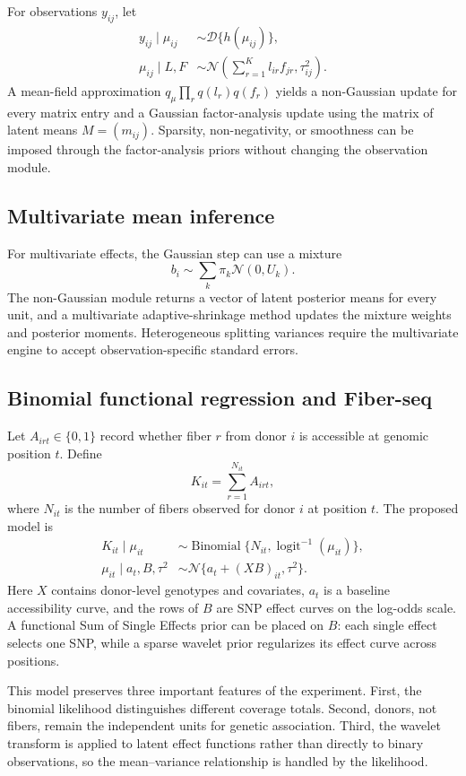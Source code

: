 \documentclass[11pt]{article}
\newcommand{\N}{\mathcal{N}}
\newcommand{\Bin}{\operatorname{Binomial}}
\newcommand{\sigmoid}{\operatorname{logit}^{-1}}
\begin{document}
For observations $y_{ij}$, let
\begin{align}
 y_{ij}\mid\mu_{ij}&\sim\mathcal{D}\{h(\mu_{ij})\},\\
 \mu_{ij}\mid L,F&\sim
 \N\left(\sum_{r=1}^K l_{ir}f_{jr},\tau_{ij}^2\right).
\end{align}
A mean-field approximation
$q_\mu\prod_r q(l_r)q(f_r)$ yields a non-Gaussian update for every matrix
entry and a Gaussian factor-analysis update using the matrix of latent means
$M=(m_{ij})$. Sparsity, non-negativity, or smoothness can be imposed through
the factor-analysis priors without changing the observation module.

\subsection{Multivariate mean inference}

For multivariate effects, the Gaussian step can use a mixture
\[
 b_i\sim\sum_k\pi_k\N(0,U_k).
\]
The non-Gaussian module returns a vector of latent posterior means for every
unit, and a multivariate adaptive-shrinkage method updates the mixture weights
and posterior moments. Heterogeneous splitting variances require the
multivariate engine to accept observation-specific standard errors.

\subsection{Binomial functional regression and Fiber-seq}
\label{sec:fiberseq}

Let $A_{irt}\in\{0,1\}$ record whether fiber $r$ from donor $i$ is accessible
at genomic position $t$. Define
\[
 K_{it}=\sum_{r=1}^{N_{it}}A_{irt},
 \]
where $N_{it}$ is the number of fibers observed for donor $i$ at position $t$.
The proposed model is
\begin{align}
 K_{it}\mid\mu_{it}
 &\sim\Bin\{N_{it},\sigmoid(\mu_{it})\},
 \label{eq:fiber-binomial}\\
 \mu_{it}\mid a_t,B,\tau^2
 &\sim\N\{a_t+(XB)_{it},\tau^2\}.
 \label{eq:fiber-latent}
\end{align}
Here $X$ contains donor-level genotypes and covariates, $a_t$ is a baseline
accessibility curve, and the rows of $B$ are SNP effect curves on the log-odds
scale. A functional Sum of Single Effects prior can be placed on $B$: each
single effect selects one SNP, while a sparse wavelet prior regularizes its
effect curve across positions.

This model preserves three important features of the experiment. First, the
binomial likelihood distinguishes different coverage totals. Second, donors,
not fibers, remain the independent units for genetic association. Third, the
wavelet transform is applied to latent effect functions rather than directly
to binary observations, so the mean--variance relationship is handled by the
likelihood.
\end{document}
